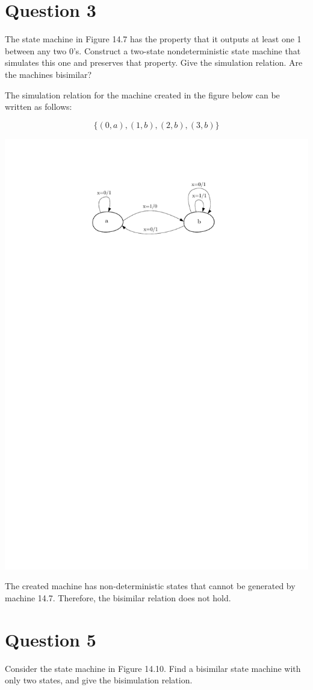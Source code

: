 \documentclass[12pt]{article}
\begin{document}
\section{Question 3}
The state machine in Figure 14.7 has the property that it outputs at least one 1
between any two 0’s. Construct a two-state nondeterministic state machine that
simulates this one and preserves that property. Give the simulation relation. Are
the machines bisimilar?



\begin{qsolve}
	The simulation relation for the machine created in the figure below can be written as follows:
	
	$$ \{ (0, a), (1, b), (2, b), (3, b) \} $$
	
	\begin{center}
		\includegraphics*[width=0.6\linewidth]{images/Q3//Q3.pdf}
	\end{center}
	
	The created machine has non-deterministic states that cannot be generated by machine 14.7. Therefore, the bisimilar relation does not hold.
	
\end{qsolve}
\vfil
\clearpage






\section{Question 5}
Consider the state machine in Figure 14.10. Find a bisimilar state machine with
only two states, and give the bisimulation relation.
\end{document}
